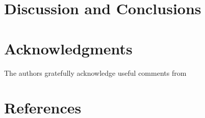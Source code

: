 \documentclass[hidelinks,preprint,12pt]{elsarticle}
\begin{document}





\section{Discussion and Conclusions}\label{sec:Conclusion}

\appendix
%

\section*{Acknowledgments}
The authors gratefully acknowledge useful comments from %


\section*{References}

%

\end{document}
